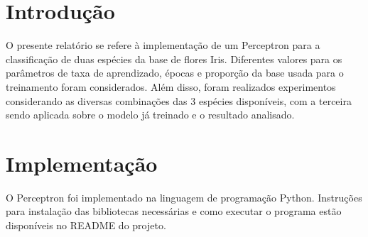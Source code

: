 \documentclass[12pt, %
openright, 
oneside, %
a4paper,    %
brazil]{facom-ufu-abntex2}
\begin{document}
 
\frenchspacing 

\imprimircapa







\listoffigures*
\cleardoublepage

\chapter{Introdução}
O presente relatório se refere à implementação de um Perceptron para a classificação de duas espécies da base de flores Iris. Diferentes valores para os parâmetros de taxa de aprendizado, épocas e proporção da base usada para o treinamento foram considerados. Além disso, foram realizados experimentos considerando as diversas combinações das 3 espécies disponíveis, com a terceira sendo aplicada sobre o modelo já treinado e o resultado analisado.

\chapter{Implementação}
O Perceptron foi implementado na linguagem de programação Python. Instruções para instalação das bibliotecas necessárias e como executar o programa estão disponíveis no README do projeto.
\end{document}
